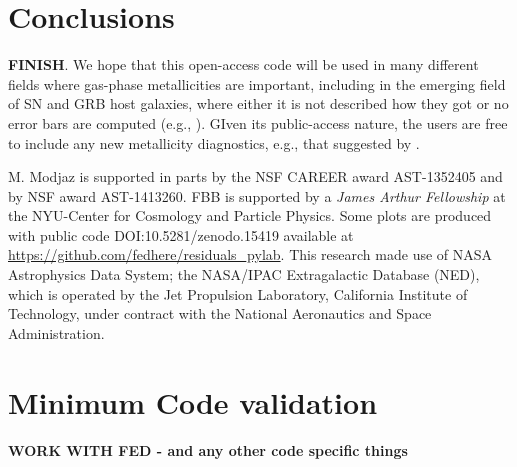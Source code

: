 \documentclass{emulateapj}
\begin{document}
\section{Conclusions}\label{comp_sec}

 \textbf{FINISH}. We hope that this open-access code will be used in many different fields where gas-phase metallicities are important, including in the emerging field of SN and GRB host galaxies, where either it is not described how they got  or no error bars are computed (e.g., \citealt{lunnan14}). GIven its public-access nature, the users are free to include any new metallicity diagnostics, e.g., that suggested by \citet{dopita13}.

\acknowledgements
M. Modjaz is supported in parts by the NSF CAREER award AST-1352405 and by NSF award AST-1413260. FBB is supported by a \emph{James Arthur Fellowship} at the NYU-Center for Cosmology and Particle Physics. Some plots are  produced with public code DOI:10.5281/zenodo.15419 available at \url{https://github.com/fedhere/residuals_pylab}.
 This research made use of NASA Astrophysics Data
System; the NASA/IPAC Extragalactic Database (NED), which
is operated by the Jet Propulsion Laboratory, California Institute
of Technology, under contract with the National Aeronautics
and Space Administration.







%


\appendix

\section{Minimum Code validation}
\textbf{WORK WITH FED - and any other code specific things}
\end{document}
